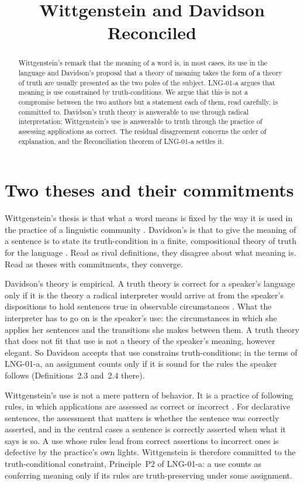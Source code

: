 \documentclass{situationist-preprint}
\title{Wittgenstein and Davidson Reconciled}
\begin{document}
\maketitle

\begin{abstract}
Wittgenstein's remark that the meaning of a word is, in most cases, its use in the language and Davidson's proposal that a theory of meaning takes the form of a theory of truth are usually presented as the two poles of the subject. LNG-01-a argues that meaning is use constrained by truth-conditions. We argue that this is not a compromise between the two authors but a statement each of them, read carefully, is committed to. Davidson's truth theory is answerable to use through radical interpretation; Wittgenstein's use is answerable to truth through the practice of assessing applications as correct. The residual disagreement concerns the order of explanation, and the Reconciliation theorem of LNG-01-a settles it.
\end{abstract}

\section{Two theses and their commitments}

Wittgenstein's thesis is that what a word means is fixed by the way it is used in the practice of a linguistic community \citep[§43]{Wittgenstein1953}. Davidson's is that to give the meaning of a sentence is to state its truth-condition in a finite, compositional theory of truth for the language \citep{Davidson1967}. Read as rival definitions, they disagree about what meaning is. Read as theses with commitments, they converge.

Davidson's theory is empirical. A truth theory is correct for a speaker's language only if it is the theory a radical interpreter would arrive at from the speaker's dispositions to hold sentences true in observable circumstances \citep{Davidson1973}. What the interpreter has to go on is the speaker's use: the circumstances in which she applies her sentences and the transitions she makes between them. A truth theory that does not fit that use is not a theory of the speaker's meaning, however elegant. So Davidson accepts that use constrains truth-conditions; in the terms of LNG-01-a, an assignment counts only if it is sound for the rules the speaker follows (Definitions~2.3 and~2.4 there).

Wittgenstein's use is not a mere pattern of behavior. It is a practice of following rules, in which applications are assessed as correct or incorrect \citep[§§199--202]{Wittgenstein1953}. For declarative sentences, the assessment that matters is whether the sentence was correctly asserted, and in the central cases a sentence is correctly asserted when what it says is so. A use whose rules lead from correct assertions to incorrect ones is defective by the practice's own lights. Wittgenstein is therefore committed to the truth-conditional constraint, Principle~P2 of LNG-01-a: a use counts as conferring meaning only if its rules are truth-preserving under some assignment.
\end{document}
